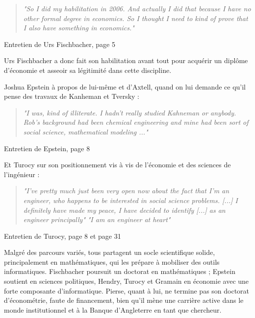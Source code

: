 \begin{quote}
\begin{center}
\textit{"So I did my habilitation in 2006. And actually I did that because I have no other formal degree in economics. So I thought I need to kind of prove that I also have something in economics."}
\end{center}
\end{quote} \hfill Entretien de Urs Fischbacher\cite{fischbacherInterviewUrsFischbacher2024}, page 5

Urs Fischbacher a donc fait son habilitation avant tout pour acquérir un diplôme d'économie et asseoir sa légitimité dans cette discipline.

Joshua Epstein à propos de lui-même et d'Axtell, quand on lui demande ce qu'il pense des travaux de Kanheman et Tversky :

\begin{quote}
\begin{center}
\textit{"I was, kind of illiterate. I hadn’t really studied Kahneman or anybody. Rob’s
background had been chemical engineering and mine had been sort of social science, mathematical
modeling ..."}
\end{center}
\end{quote} \hfill Entretien de Epstein\cite{epsteinGrowingArtificialSocieties1996}, page 8

Et Turocy sur son positionnement vis à vis de l'économie et des sciences de l'ingénieur :

\begin{quote}
\begin{center}
\textit{"I’ve pretty much just been very open now about the fact that I’m an engineer, who happens to be interested in social science problems. [...] I definitely have made my peace, I have decided to identify [...] as an engineer principally"}
\break
\textit{"I am an engineer at heart"}
\end{center}
\end{quote} \hfill Entretien de Turocy\cite{turocyInterviewTheodoreTurocy2024}, page 8 et page 31


Malgré des parcours variés, tous partagent un socle scientifique solide, principalement en mathématiques, qui les prépare à mobiliser des outils informatiques. Fischbacher poursuit un doctorat en mathématiques ; Epstein soutient en sciences politiques, Hendry, Turocy et Gramain en économie avec une forte composante d'informatique. Pierse, quant à lui, ne termine pas son doctorat d'économétrie, faute de financement, bien qu’il mène une carrière active dans le monde institutionnel et à la Banque d’Angleterre en tant que chercheur.

